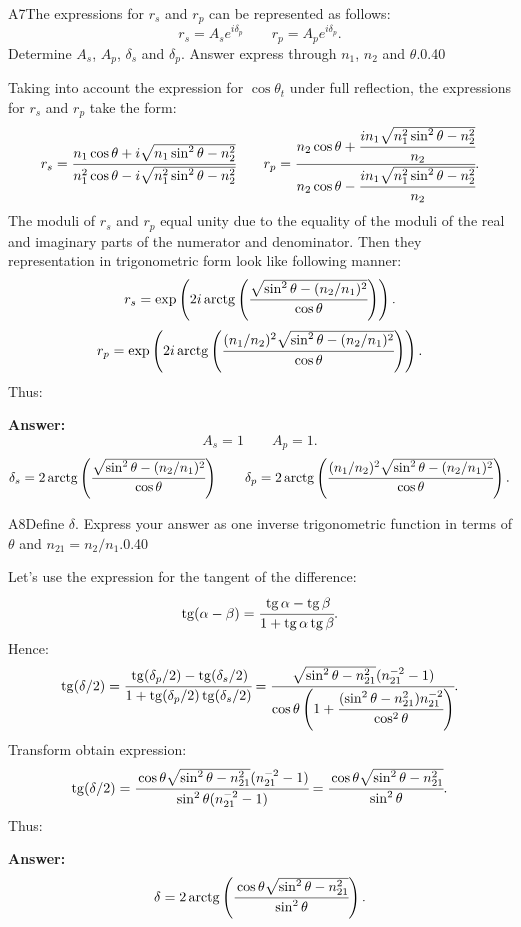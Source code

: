 \documentclass[11pt,a4paper]{article}
\begin{document}
\begin{solcard}{A7}{The expressions for $r_s$ and $r_p$ can be represented as follows: $$r_s=A_se^{i\delta_p}\qquad r_p=A_pe^{i\delta_p}{.} $$Determine $A_s$, $A_p$, $\delta_s$ and $\delta_p$. Answer express through $n_1$, $n_2$ and $\theta$.}{0.40}

Taking into account the expression for $\cos\theta_t$ under full reflection, the expressions for $r_s$ and $r_p$ take the form: $$r_s=\cfrac{n_1\cos\theta+i\sqrt{n_1\sin^2\theta-n^2_2}}{n^2_1\cos\theta-i\sqrt{n^2_1\sin^2\theta-n^2_2}}\qquad r_p=\cfrac{n_2\cos\theta+\cfrac{in_1\sqrt{n^2_1\sin^2\theta-n^2_2}}{n_2}}{n_2\cos\theta-\cfrac{in_1\sqrt{n^2_1\sin^2\theta-n^2_2}}{n_2}}{.} $$The moduli of $r_s$ and $r_p$ equal unity due to the equality of the moduli of the real and imaginary parts of the numerator and denominator. Then they representation in trigonometric form look like following manner: $$r_s=\exp\left(2i\operatorname{arctg}\left(\cfrac{\sqrt{\sin^2\theta-(n_2/n_1)^2}}{\cos\theta}\right)\right){.} $$$$r_p=\exp\left(2i\operatorname{arctg}\left(\cfrac{(n_1/n_2)^2\sqrt{\sin^2\theta-(n_2/n_1)^2}}{\cos\theta}\right)\right){.} $$Thus:

\par\smallskip\noindent\textbf{Answer:} $$A_s=1\qquad A_p=1{.} $$$$\delta_s=2\operatorname{arctg}\left(\cfrac{\sqrt{\sin^2\theta-(n_2/n_1)^2}}{\cos\theta}\right)\qquad \delta_p=2\operatorname{arctg}\left(\cfrac{(n_1/n_2)^2\sqrt{\sin^2\theta-(n_2/n_1)^2}}{\cos\theta}\right){.} $$
\end{solcard}

\begin{solcard}{A8}{Define $\delta$. Express your answer as one inverse trigonometric function in terms of $\theta$ and $n_{21}=n_2/n_1$.}{0.40}

Let's use the expression for the tangent of the difference: $$\operatorname{tg}(\alpha-\beta)=\cfrac{\operatorname{tg}\alpha-\operatorname{tg}\beta}{1+\operatorname{tg}\alpha\operatorname{tg}\beta}{.} $$Hence: $$\operatorname{tg}(\delta/2)=\cfrac{\operatorname{tg}(\delta_p/2)-\operatorname{tg}(\delta_s/2)}{1+\operatorname{tg}(\delta_p/2)\operatorname{tg}(\delta_s/2)}=\cfrac{\sqrt{\sin^2\theta-n^2_{21}}(n^{-2}_{21}-1)}{\cos\theta\left(1+\cfrac{(\sin^2\theta-n^2_{21})n^{-2}_{21}}{\cos^2\theta}\right)}{.} $$Transform obtain expression: $$\operatorname{tg}(\delta/2)=\cfrac{\cos\theta\sqrt{\sin^2\theta-n^2_{21}}(n^{-2}_{21}-1)}{\sin^2\theta(n^{-2}_{21}-1)}=\cfrac{\cos\theta\sqrt{\sin^2\theta-n^2_{21}}}{\sin^2\theta}{.} $$Thus:

\par\smallskip\noindent\textbf{Answer:} $$\delta=2\operatorname{arctg}\left(\cfrac{\cos\theta\sqrt{\sin^2\theta-n^2_{21}}}{\sin^2\theta}\right){.} $$
\end{solcard}
\end{document}
